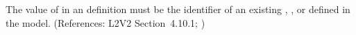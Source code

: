 The value of  in an \InitialAssignment definition must be the
identifier of an existing \Compartment, \Species, or \Parameter defined in
the model.  (References: L2V2 Section~4.10.1; )
